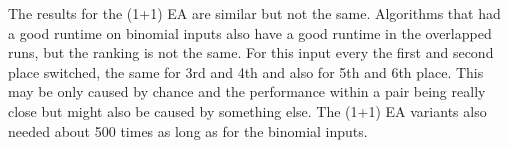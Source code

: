 The results for the (1+1) EA are similar but not the same.
Algorithms that had a good runtime on binomial inputs also have a good runtime in the overlapped runs, but the ranking is not the same.
For this input every the first and second place switched, the same for 3rd and 4th and also for 5th and 6th place.
This may be only caused by chance and the performance within a pair being really close but might also be caused by something else.
The (1+1) EA variants also needed about 500 times as long as for the binomial inputs.
